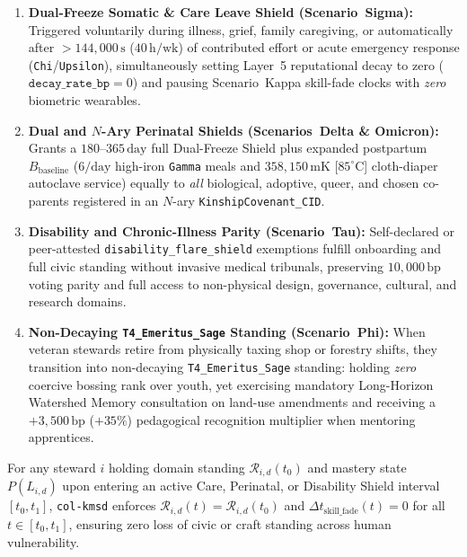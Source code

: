 \begin{enumerate}
    \item \textbf{Dual-Freeze Somatic \& Care Leave Shield (Scenario~Sigma):} Triggered voluntarily
    during illness, grief, family caregiving, or automatically after $> 144{,}000\,\mathrm{s}$
    ($40\,\mathrm{h/wk}$) of contributed effort or acute emergency response (\texttt{Chi}/\texttt{Upsilon}),
    simultaneously setting Layer~5 reputational decay to zero ($\mathtt{decay\_rate\_bp} = 0$) and
    pausing Scenario~Kappa skill-fade clocks with \textit{zero} biometric wearables.
    \item \textbf{Dual and $N$-Ary Perinatal Shields (Scenarios~Delta \& Omicron):} Grants a
    $180\text{--}365\,\mathrm{day}$ full Dual-Freeze Shield plus expanded postpartum $B_{\mathrm{baseline}}$
    ($6/\mathrm{day}$ high-iron \texttt{Gamma} meals and $358{,}150\,\mathrm{mK}$ [$85^\circ\mathrm{C}$]
    cloth-diaper autoclave service) equally to \textit{all} biological, adoptive, queer, and chosen
    co-parents registered in an $N$-ary \texttt{KinshipCovenant\_CID}.
    \item \textbf{Disability and Chronic-Illness Parity (Scenario~Tau):} Self-declared or
    peer-attested \texttt{disability\_flare\_shield} exemptions fulfill onboarding and full civic
    standing without invasive medical tribunals, preserving $10{,}000\,\mathrm{bp}$ voting parity
    and full access to non-physical design, governance, cultural, and research domains.
    \item \textbf{Non-Decaying \texttt{T4\_Emeritus\_Sage} Standing (Scenario~Phi):} When veteran
    stewards retire from physically taxing shop or forestry shifts, they transition into
    non-decaying \texttt{T4\_Emeritus\_Sage} standing: holding \textit{zero} coercive bossing rank
    over youth, yet exercising mandatory Long-Horizon Watershed Memory consultation on land-use
    amendments and receiving a $+3{,}500\,\mathrm{bp}$ ($+35\%$) pedagogical recognition multiplier
    when mentoring apprentices.
\end{enumerate}

\begin{definition}
\label{def:ch6-care-freeze}
For any steward $i$ holding domain standing $\mathcal{R}_{i,d}(t_0)$ and mastery state $P(L_{i,d})$
upon entering an active Care, Perinatal, or Disability Shield interval $[t_0, t_1]$, \texttt{col-kmsd}
enforces $\mathcal{R}_{i,d}(t) = \mathcal{R}_{i,d}(t_0)$ and $\Delta t_{\mathrm{skill\_fade}}(t) = 0$
for all $t \in [t_0, t_1]$, ensuring zero loss of civic or craft standing across human vulnerability.
\end{definition}

